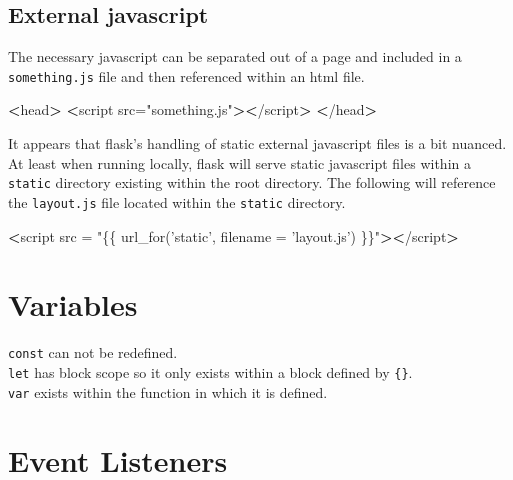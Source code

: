 \documentclass[]{book}
\newenvironment{Shaded}{\begin{snugshade}}{\end{snugshade}}
\newcommand{\ExtensionTok}[1]{#1}
\newcommand{\FunctionTok}[1]{\textcolor[rgb]{0.00,0.00,0.00}{#1}}
\newcommand{\NormalTok}[1]{#1}
\newcommand{\OperatorTok}[1]{\textcolor[rgb]{0.81,0.36,0.00}{\textbf{#1}}}
\newcommand{\StringTok}[1]{\textcolor[rgb]{0.31,0.60,0.02}{#1}}
\begin{document}
\hypertarget{external-javascript}{%
\subsection{External javascript}\label{external-javascript}}

The necessary javascript can be separated out of a page and included in a \texttt{something.js} file and then referenced within an html file.

\begin{Shaded}
\begin{Highlighting}[]
\OperatorTok{<}\FunctionTok{head}\OperatorTok{>}                                 
    \OperatorTok{<}\ExtensionTok{script}\NormalTok{ src=}\StringTok{"something.js"}\OperatorTok{><}\NormalTok{/script}\OperatorTok{>}
\OperatorTok{<}\NormalTok{/}\ExtensionTok{head}\OperatorTok{>}                                
\end{Highlighting}
\end{Shaded}

It appears that flask's handling of static external javascript files is a bit nuanced. At least when running locally, flask will serve static javascript files within a \texttt{static} directory existing within the root directory. The following will reference the \texttt{layout.js} file located within the \texttt{static} directory.

\begin{Shaded}
\begin{Highlighting}[]
\OperatorTok{<}\ExtensionTok{script}\NormalTok{ src = }\StringTok{"\{\{ url_for('static', filename = 'layout.js') \}\}"}\OperatorTok{><}\NormalTok{/script}\OperatorTok{>}
\end{Highlighting}
\end{Shaded}

\hypertarget{variables}{%
\section{Variables}\label{variables}}

\texttt{const} can not be redefined.\\
\texttt{let} has block scope so it only exists within a block defined by \texttt{\{\}}.\\
\texttt{var} exists within the function in which it is defined.

\hypertarget{event-listeners}{%
\section{Event Listeners}\label{event-listeners}}
\end{document}
